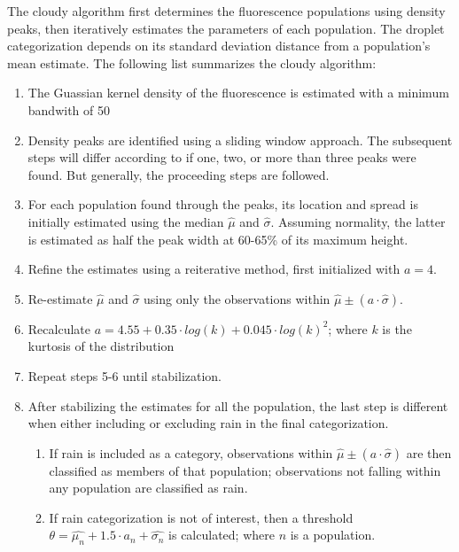 The cloudy algorithm first determines the fluorescence populations using density peaks, then iteratively estimates the parameters of each population. The droplet categorization depends on its standard deviation distance from a population's mean estimate. The following list summarizes the cloudy algorithm:
\begin{enumerate}
    \item The Guassian kernel density of the fluorescence is estimated with a minimum bandwith of 50
    \item Density peaks are identified using a sliding window approach. The subsequent steps will differ according to if one, two, or more than three peaks were found.  But generally, the proceeding steps are followed.
    \item For each population found through the peaks, its location and spread is initially estimated using the median \(\hat{\mu}\) and \(\hat{\sigma}\). Assuming normality, the latter is estimated as half the peak width at 60-65\% of its maximum height.
    \item Refine the estimates using a reiterative method, first initialized with \(a=4\).
    \item Re-estimate \(\hat{\mu}\) and \(\hat{\sigma}\) using only the observations within \(\hat{\mu} \pm (a \cdot \hat{\sigma})\).
    \item Recalculate \(a=4.55 + 0.35 \cdot log(k) + 0.045 \cdot log(k)^2\); where \(k\) is the kurtosis of the distribution
    \item Repeat steps 5-6 until stabilization.
    \item After stabilizing the estimates for all the population, the last step is different when either including or excluding rain in the final categorization. 
    \begin{enumerate}
        \item If rain is included as a category, observations within \(\hat{\mu} \pm (a \cdot \hat{\sigma})\) are then classified as members of that population; observations not falling within any population are classified as rain.
        \item If rain categorization is not of interest, then a threshold \(\theta=\hat{\mu_n} + 1.5 \cdot a_n + \hat{\sigma_n}\) is calculated; where \(n\) is a population.  
    \end{enumerate}

\end{enumerate}

